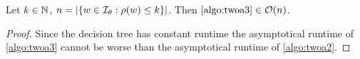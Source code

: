 \begin{lemm}
	Let $k \in \mathbb{N}$, $n = |\{ w \in \mathcal{I}_{\theta} : \rho(w) \leq k \}|$. Then $\ref{algo:twoa3} \in \mathcal{O}(n)$.

	\begin{proof}
		Since the decision tree has constant runtime the asymptotical runtime of \ref{algo:twoa3} cannot be worse than the asymptotical runtime of \ref{algo:twoa2}.
	\end{proof}
\end{lemm}
